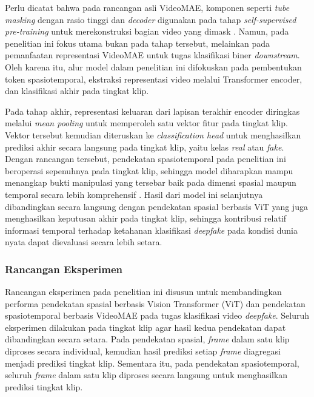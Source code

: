 Perlu dicatat bahwa pada rancangan asli VideoMAE, komponen seperti \textit{tube masking} dengan rasio tinggi dan \textit{decoder} digunakan pada tahap \textit{self-supervised pre-training} untuk merekonstruksi bagian video yang dimask \cite{tong2022videomaemaskedautoencodersdataefficient}. Namun, pada penelitian ini fokus utama bukan pada tahap tersebut, melainkan pada pemanfaatan representasi VideoMAE untuk tugas klasifikasi biner \textit{downstream}. Oleh karena itu, alur model dalam penelitian ini difokuskan pada pembentukan token spasiotemporal, ekstraksi representasi video melalui Transformer encoder, dan klasifikasi akhir pada tingkat klip. \par

Pada tahap akhir, representasi keluaran dari lapisan terakhir encoder diringkas melalui \textit{mean pooling} untuk memperoleh satu vektor fitur pada tingkat klip. Vektor tersebut kemudian diteruskan ke \textit{classification head} untuk menghasilkan prediksi akhir secara langsung pada tingkat klip, yaitu kelas \textit{real} atau \textit{fake}. Dengan rancangan tersebut, pendekatan spasiotemporal pada penelitian ini beroperasi sepenuhnya pada tingkat klip, sehingga model diharapkan mampu menangkap bukti manipulasi yang tersebar baik pada dimensi spasial maupun temporal secara lebih komprehensif \cite{Gu2021}\cite{tong2022videomaemaskedautoencodersdataefficient}. Hasil dari model ini selanjutnya dibandingkan secara langsung dengan pendekatan spasial berbasis ViT yang juga menghasilkan keputusan akhir pada tingkat klip, sehingga kontribusi relatif informasi temporal terhadap ketahanan klasifikasi \textit{deepfake} pada kondisi dunia nyata dapat dievaluasi secara lebih setara. \par

\subsubsection{Rancangan Eksperimen}
Rancangan eksperimen pada penelitian ini disusun untuk membandingkan performa pendekatan spasial berbasis Vision Transformer (ViT) dan pendekatan spasiotemporal berbasis VideoMAE pada tugas klasifikasi video \textit{deepfake}. Seluruh eksperimen dilakukan pada tingkat klip agar hasil kedua pendekatan dapat dibandingkan secara setara. Pada pendekatan spasial, \textit{frame} dalam satu klip diproses secara individual, kemudian hasil prediksi setiap \textit{frame} diagregasi menjadi prediksi tingkat klip. Sementara itu, pada pendekatan spasiotemporal, seluruh \textit{frame} dalam satu klip diproses secara langsung untuk menghasilkan prediksi tingkat klip. \par

